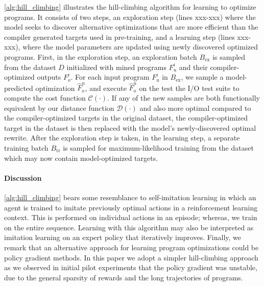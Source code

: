 \documentclass{article}
\begin{document}
\cref{alg:hill_climbing} illustrates the hill-climbing algorithm for learning to optimize programs.
It consists of two steps, an exploration step (lines xxx-xxx) where the model seeks to discover alternative optimizations that are more efficient than the compiler generated targets used in pre-training, and a learning step (lines xxx-xxx), where the model parameters are updated using newly discovered optimized programs.
First, in the exploration step, an exploration batch $B_{\mathrm{ex}}$ is sampled from the dataset $D$ initialized with mined programs $F^i_u$ and their compiler-optimized outputs $F^i_o$. 
For each input program $F^i_u$ in $B_{\mathrm{ex}}$, we sample a model-predicted optimization $\hat{F}^u_o$, and execute $\hat{F}^u_o$ on the test the I/O test suite to compute the cost function $\mathcal{C}(\cdot)$.
If any of the new samples are both functionally equivalent by our distance function $\mathcal{D}(\cdot)$ and also more optimal compared to the compiler-optimized targets in the original dataset, the compiler-optimized target in the dataset is then replaced with the model's newly-discovered optimal rewrite. 
After the exploration step is taken, in the learning step, a separate training batch $B_{\mathrm{tr}}$ is sampled for maximum-likelihood training from the dataset which may now contain model-optimized targets. 

\paragraph{Discussion} \cref{alg:hill_climbing} bears some resemblance to self-imitation learning \cite{oh2018self} in which an agent is trained to imitate previously optimal actions in a reinforcement learning context. This is performed on individual actions in an episode; whereas, we train on the entire sequence. Learning with this algorithm may also be interpreted as imitation learning on an expert policy that iteratively improves. 
Finally, we remark that an alternative approach for learning program optimizations could be policy gradient methods.
In this paper we adopt a simpler hill-climbing approach as we observed in initial pilot experiments that the policy gradient was unstable, due to the general sparsity of rewards and the long trajectories of programs. 
\end{document}
